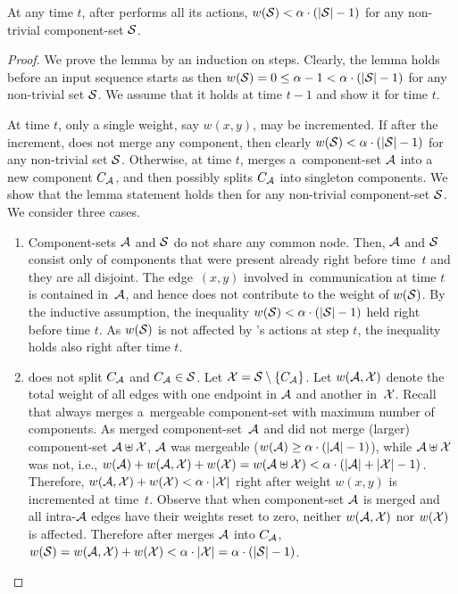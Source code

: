 \begin{lemma}
\label{lem:wS_bound}
At any time $t$, after \CREP performs all its actions,
$w(\mathcal{S}) < \alpha \cdot (|\mathcal{S}|-1)$ for any non-trivial component-set $\mathcal{S}$.
\end{lemma}

\begin{proof}
We prove the lemma by an induction on steps. Clearly, the lemma holds before an
input sequence starts as then $w(\mathcal{S}) = 0 \leq \alpha - 1 < \alpha \cdot
(|\mathcal{S}|-1)$ for any non-trivial set $\mathcal{S}$. We assume that it holds at time $t-1$
and show it for time $t$.

At time $t$, only a single weight, say $w(x,y)$, may be incremented. If after
the increment, \CREP does not merge any component, then clearly $w(\mathcal{S}) < \alpha
\cdot (|\mathcal{S}|-1)$ for any non-trivial set $\mathcal{S}$. Otherwise, at time $t$, \CREP
merges a~component-set $\mathcal{A}$ into a new component $C_{\mathcal{A}}$, and then possibly
splits $C_{\mathcal{A}}$ into singleton components. We show that
the lemma statement holds then for any non-trivial component-set $\mathcal{S}$. We
consider three cases.

\begin{enumerate}

\item Component-sets $\mathcal{A}$ and $\mathcal{S}$ do not share any common node. Then, $\mathcal{A}$ and
$\mathcal{S}$ consist only of components that were present already right before time~$t$
and they are all disjoint. The edge~$(x,y)$ involved in~communication at time
$t$ is contained in~$\mathcal{A}$, and hence does not contribute to the weight of
$w(\mathcal{S})$. By the inductive assumption, the inequality 
$w(\mathcal{S}) < \alpha \cdot (|\mathcal{S}|-1)$ held right
before time $t$. As $w(\mathcal{S})$ is not affected by \CREP's actions at step $t$, the
inequality holds also right after time $t$.

\item \CREP does not split $C_{\mathcal{A}}$ and $C_{\mathcal{A}} \in \mathcal{S}$. Let $\mathcal{X} = \mathcal{S} \setminus
\{C_{\mathcal{A}}\}$. Let $w(\mathcal{A},\mathcal{X})$ denote the total weight of all edges with one endpoint
in $\mathcal{A}$ and another in~$\mathcal{X}$. Recall that
\CREP always merges a~mergeable component-set with maximum number of components. 
As \CREP merged component-set~$\mathcal{A}$ and did not merge
(larger) component-set $\mathcal{A} \uplus \mathcal{X}$, $\mathcal{A}$ was mergeable ($w(\mathcal{A}) \geq \alpha \cdot
(|\mathcal{A}|-1)$), while $\mathcal{A} \uplus \mathcal{X}$ was not, i.e., $w(\mathcal{A}) + w(\mathcal{A},\mathcal{X}) + w(\mathcal{X}) = w(\mathcal{A}
\uplus \mathcal{X}) < \alpha \cdot (|\mathcal{A}|+|\mathcal{X}|-1)$. Therefore, $w(\mathcal{A},\mathcal{X}) + w(\mathcal{X}) < \alpha
\cdot |\mathcal{X}|$ right after weight $w(x,y)$ is incremented at time~$t$. Observe
that when component-set $\mathcal{A}$ is merged and all intra-$\mathcal{A}$ edges have their weights 
reset to zero, neither $w(\mathcal{A},\mathcal{X})$ nor $w(\mathcal{X})$ is affected.
Therefore after \CREP merges $\mathcal{A}$ into $C_{\mathcal{A}}$, $w(\mathcal{S}) =
w(\mathcal{A},\mathcal{X}) + w(\mathcal{X}) < \alpha \cdot |\mathcal{X}| = \alpha \cdot (|\mathcal{S}| - 1)$.


\end{enumerate}
\end{proof}
